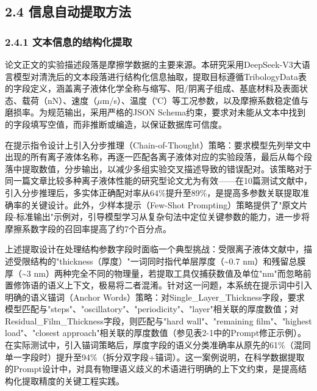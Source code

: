 \hypertarget{ux4fe1ux606fux81eaux52a8ux63d0ux53d6ux65b9ux6cd5}{%
\subsection{2.4 信息自动提取方法}\label{ux4fe1ux606fux81eaux52a8ux63d0ux53d6ux65b9ux6cd5}}

\hypertarget{ux6587ux672cux4fe1ux606fux7684ux7ed3ux6784ux5316ux63d0ux53d6}{%
\subsubsection{2.4.1 文本信息的结构化提取}\label{ux6587ux672cux4fe1ux606fux7684ux7ed3ux6784ux5316ux63d0ux53d6}}

论文正文的实验描述段落是摩擦学数据的主要来源。本研究采用DeepSeek-V3大语言模型对清洗后的文本段落进行结构化信息抽取\cite{ref29}，提取目标遵循TribologyData表的字段定义，涵盖离子液体化学全称与缩写、阳/阴离子组成、基底材料及表面状态、载荷（nN）、速度（$\mu$m/s）、温度（℃）等工况参数，以及摩擦系数稳定值与磨损率。为规范输出，采用严格的JSON Schema约束，要求对未能从文本中找到的字段填写空值，而非推断或编造，以保证数据库可信度。

在提示指令设计上引入分步推理（Chain-of-Thought）策略\cite{ref28}：要求模型先列举文中出现的所有离子液体名称，再逐一匹配各离子液体对应的实验段落，最后从每个段落中提取数值，分步输出，以减少多组实验交叉描述导致的错误配对。该策略对于同一篇文章比较多种离子液体性能的研究型论文尤为有效------在10篇测试文献中，引入分步推理后，多实体正确配对率从64\%提升至89\%，是提高多参数关联提取准确率的关键设计。此外，少样本提示（Few-Shot Prompting）策略提供了"原文片段-标准输出"示例对，引导模型学习从复杂句法中定位关键参数的能力，进一步将摩擦系数字段的召回率提高了约7个百分点。

上述提取设计在处理结构参数字段时面临一个典型挑战：受限离子液体文献中，描述受限结构的"thickness（厚度）"一词同时指代单层厚度（\textasciitilde0.7 nm）和残留总膜厚（\textasciitilde3 nm）两种完全不同的物理量，若提取工具仅捕获数值及单位"nm"而忽略前置修饰语的语义上下文，极易将二者混淆。针对这一问题，本系统在提示词中引入明确的语义锚词（Anchor Words）策略：对Single\_Layer\_Thickness字段，要求模型匹配与"steps"、"oscillatory"、"periodicity"、"layer"相关联的厚度数值；对Residual\_Film\_Thickness字段，则匹配与"hard wall"、"remaining film"、"highest load"、"closest approach"相关联的厚度数值（参见表2-1中的Prompt修正示例）。在实际测试中，引入锚词策略后，厚度字段的语义分类准确率从原先的61\%（混同单一字段时）提升至94\%（拆分双字段+锚词）。这一案例说明，在科学数据提取的Prompt设计中，对具有物理语义歧义的术语进行明确的上下文约束，是提高结构化提取精度的关键工程实践\cite{ref7,ref17}。

